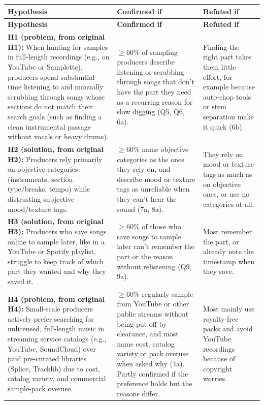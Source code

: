 \documentclass[12pt,a4paper]{report}
\begin{document}
\begingroup
\small
\renewcommand{\arraystretch}{1.25}
\begin{xltabular}{\textwidth}{|>{\hsize\raggedright\arraybackslash}X|>{\hsize\raggedright\arraybackslash}X|>{\hsize\raggedright\arraybackslash}X|}
\hline
{} \textbf{Hypothesis} & \textbf{Confirmed if} & \textbf{Refuted if} \\
\hline
\endfirsthead
\hline
{} \textbf{Hypothesis} & \textbf{Confirmed if} & \textbf{Refuted if} \\
\hline
\endhead
\textbf{H1 (problem, from original H1):} When hunting for samples in full-length recordings (e.g., on YouTube or Samplette), producers spend substantial time listening to and manually scrubbing through songs whose sections do not match their search goals (such as finding a clean instrumental passage without vocals or heavy drums). & $\geq$60\% of sampling producers describe listening or scrubbing through songs that don’t have the part they need as a recurring reason for slow digging (Q5, Q6, 6a). & Finding the right part takes them little effort, for example because auto-chop tools or stem separation make it quick (6b). \\
\hline
\textbf{H2 (solution, from original H2):} Producers rely primarily on objective categories (instruments, section type/breaks, tempo) while distrusting subjective mood/texture tags. & $\geq$60\% name objective categories as the ones they rely on, and describe mood or texture tags as unreliable when they can’t hear the sound (7a, 8a). & They rely on mood or texture tags as much as on objective ones, or use no categories at all. \\
\hline
\textbf{H3 (solution, from original H3):} Producers who save songs online to sample later, like in a YouTube or Spotify playlist, struggle to keep track of which part they wanted and why they saved it. & $\geq$60\% of those who save songs to sample later can’t remember the part or the reason without relistening (Q9, 9a). & Most remember the part, or already note the timestamp when they save. \\
\hline
\textbf{H4 (problem, from original H4):} Small-scale producers actively prefer searching for unlicensed, full-length music in streaming service catalogs (e.g., YouTube, SoundCloud) over paid pre-curated libraries (Splice, Tracklib) due to cost, catalog variety, and commercial sample-pack overuse. & $\geq$60\% regularly sample from YouTube or other public streams without being put off by clearance, and most name cost, catalog variety or pack overuse when asked why (4a). Partly confirmed if the preference holds but the reasons differ. & Most mainly use royalty-free packs and avoid YouTube recordings because of copyright worries. \\

\end{xltabular}
\end{document}
